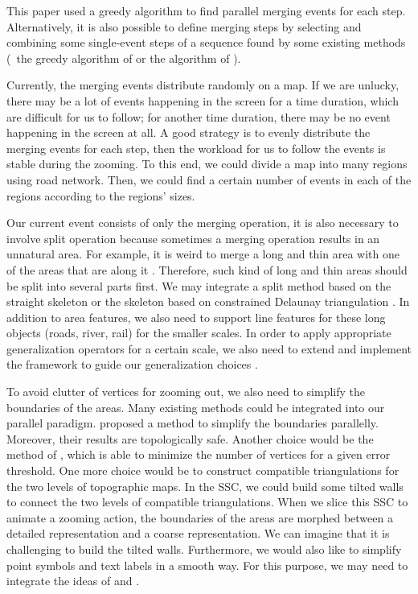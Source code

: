 \documentclass[ijgi,article,submit,moreauthors,pdftex]{Definitions/mdpi}
\begin{document}
This paper used a greedy algorithm 
to find parallel merging events for each step.
Alternatively, it is also possible to define merging steps 
by selecting and combining some single-event steps of a sequence found 
by some existing methods
(\eg~the greedy algorithm of \citet{vanOosterom2005}
or the \Astar algorithm of \citet[]{Peng2019Thesis}).

Currently, the merging events distribute randomly on a map.
If we are unlucky, there may be a lot of events happening in the screen 
for a time duration,
which are difficult for us to follow;
for another time duration, there may be no event happening in the screen at all.
A good strategy is to evenly distribute the merging events for each step, 
then the workload for us to follow the events is stable during the zooming.
To this end, we could divide a map into many regions using road network.
Then, we could find a certain number of events in each of the regions according to
the regions' sizes.


Our current event consists of only the merging operation,
it is also necessary to involve split operation
because sometimes a merging operation results in an unnatural area.
For example, it is weird to merge a long and thin area 
with one of the areas that are along it
\citep[see][]{Haunert2008Skeleton}.
Therefore, such kind of long and thin areas should be
split into several parts first.
We may integrate a split method based on the straight skeleton
\citep{Haunert2008Skeleton}
or the skeleton based on constrained Delaunay triangulation
\citep{Meijers2016Split}.
In addition to area features, we also need to support line features 
for these long objects (roads, river, rail) for the smaller scales.
In order to apply appropriate generalization operators
for a certain scale,
we also need to extend and implement the framework 
to guide our generalization choices
\citep{Meijers2018Framework}.




To avoid clutter of vertices for zooming out, 
we also need to simplify the boundaries of the areas.
Many existing methods could be integrated into our parallel paradigm.
\citet{Meijers2011LineSimp} proposed a method 
to simplify the boundaries parallelly. 
Moreover, their results are topologically safe. 
Another choice would be the method of \citet{ImaiIri1988},
which is able to minimize the number of vertices 
for a given error threshold.
One more choice would be to construct compatible triangulations 
\citep[see][]{Peng2019Thesis}
for the two levels of topographic maps.
In the SSC, we could build some tilted walls 
to connect the two levels of compatible triangulations.
When we slice this SSC to animate a zooming action,
the boundaries of the areas are morphed 
between a detailed representation and a coarse representation.
We can imagine that it is challenging to build the tilted walls.
Furthermore, we would also like to simplify point symbols and text labels
in a smooth way.
For this purpose, we may need to integrate the ideas of
\citet{Haunert2017Label} and \citet{sahw-oarps-ICAGW13}.
\end{document}
